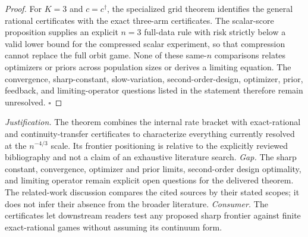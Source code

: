 \documentclass{article}
\begin{document}
\begin{proof}
For \(K=3\) and \(c=c^\dagger\), the specialized grid theorem identifies the general rational certificates with the exact three-arm certificates. The scalar-score proposition supplies an explicit \(n=3\) full-data rule with risk strictly below a valid lower bound for the compressed scalar experiment, so that compression cannot replace the full orbit game. None of these same-\(n\) comparisons relates optimizers or priors across population sizes or derives a limiting equation. The convergence, sharp-constant, slow-variation, second-order-design, optimizer, prior, feedback, and limiting-operator questions listed in the statement therefore remain unresolved. \(\square\)
\end{proof}
\par\smallskip\noindent \textit{Justification.} The theorem combines the internal rate bracket with exact-rational and continuity-transfer certificates to characterize everything currently resolved at the \(n^{-4/3}\) scale.  Its frontier positioning is relative to the explicitly reviewed bibliography and not a claim of an exhaustive literature search. \textit{Gap.} The sharp constant, convergence, optimizer and prior limits, second-order design optimality, and limiting operator remain explicit open questions for the delivered theorem.  The related-work discussion compares the cited sources by their stated scopes; it does not infer their absence from the broader literature. \textit{Consumer.} The certificates let downstream readers test any proposed sharp frontier against finite exact-rational games without assuming its continuum form.
\end{document}
